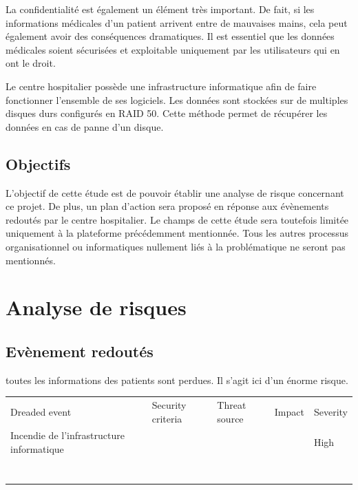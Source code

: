 \documentclass[12pt]{article}
\begin{document}
\justify
La confidentialité est également un élément très important. De fait, si les informations médicales d'un patient arrivent entre de mauvaises mains, cela peut également avoir des conséquences dramatiques. Il est essentiel que les données médicales soient sécurisées et exploitable uniquement par les utilisateurs qui en ont le droit.

\justify
Le centre hospitalier possède une infrastructure informatique afin de faire fonctionner l'ensemble de ses logiciels. Les données sont stockées sur de multiples disques durs configurés en RAID 50. Cette méthode permet de récupérer les données en cas de panne d'un disque. 

\subsection{Objectifs}

\justify
L'objectif de cette étude est de pouvoir établir une analyse de risque concernant ce projet. De plus, un plan d'action sera proposé en réponse aux évènements redoutés par le centre hospitalier. Le champs de cette étude sera toutefois limitée uniquement à la plateforme précédemment mentionnée. Tous les autres processus organisationnel ou informatiques nullement liés à la problématique ne seront pas mentionnés.

\newpage

\section{Analyse de risques}

\subsection{Evènement redoutés}

toutes les informations des patients sont perdues.
Il s'agit ici d'un énorme risque. 

\begin{table}[]
\begin{tabular}{lllll}
Dreaded event & Security criteria & Threat source & Impact & Severity \\
Incendie de l'infrastructure informatique &                   &               &        & High         \\
              &                   &               &        &          \\
              &                   &               &        &          \\
              &                   &               &        &          \\
              &                   &               &        &          \\
              &                   &               &        &          \\
              &                   &               &        &          \\
              &                   &               &        &         
\end{tabular}
\end{table}
\end{document}
